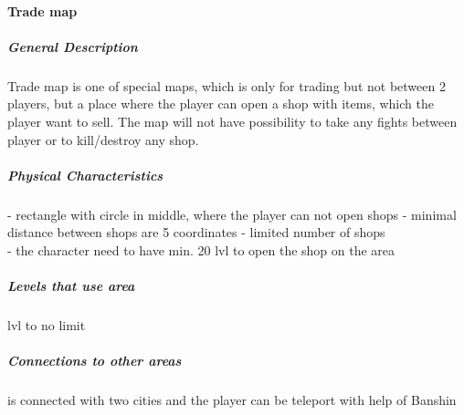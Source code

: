 \documentclass[parskip=full]{scrartcl}
\begin{document}
					\paragraph{Trade map}\vspace{-0.5cm}
						\subparagraph{General Description} \vspace{-0.5cm}
							\par \begingroup
							\leftskip=2cm
							\noindent
									Trade map is one of special maps, which is only for trading but not between 2 players, but a place where the player can open a shop with items, which the player want to sell. The map will not have possibility to take any fights between player or to kill/destroy any shop.
							\par \endgroup
						\subparagraph{Physical Characteristics} \vspace{-0.5cm}
							\par \begingroup
							\leftskip=2cm
							\noindent
									- rectangle with circle in middle, where the player can not open shops
									- minimal distance between shops are 5 coordinates
									- limited number of shops \\
									- the character need to have min. 20 lvl to open the shop on the area
							\par \endgroup
						\subparagraph{Levels that use area} \vspace{-0.5cm}
							\par \begingroup
							\leftskip=2cm
							 lvl to no limit
							\par \endgroup
						\subparagraph{Connections to other areas} \vspace{-0.5cm}
							\par \begingroup
							\leftskip=2cm
							\noindent
									is connected with two cities and the player can be teleport with help of Banshin
							\par \endgroup
\end{document}
